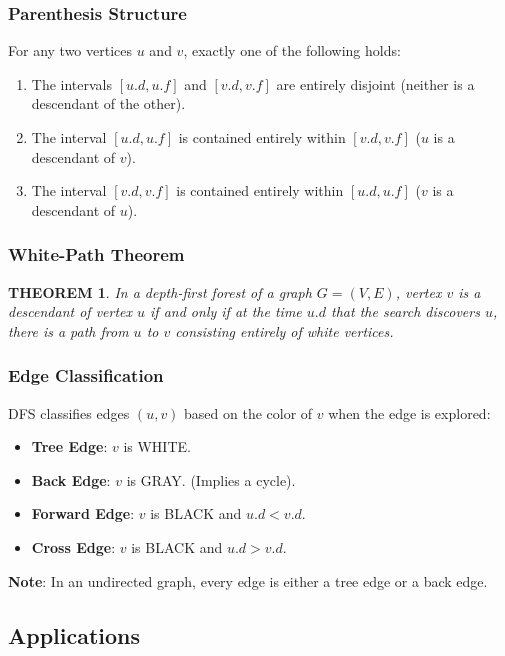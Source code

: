 \documentclass[12pt]{article}
\theoremstyle{blueplain}
\newtheorem{theorem}{THEOREM}[section]
\theoremstyle{bluedef}
\theoremstyle{blueremark}
\begin{document}
\subsubsection{Parenthesis Structure}
For any two vertices $u$ and $v$, exactly one of the following holds:
\begin{enumerate}
    \item The intervals $[u.d, u.f]$ and $[v.d, v.f]$ are entirely disjoint (neither is a descendant of the other).
    \item The interval $[u.d, u.f]$ is contained entirely within $[v.d, v.f]$ ($u$ is a descendant of $v$).
    \item The interval $[v.d, v.f]$ is contained entirely within $[u.d, u.f]$ ($v$ is a descendant of $u$).
\end{enumerate}

\subsubsection{White-Path Theorem}
\begin{theorem}
    In a depth-first forest of a graph $G=(V,E)$, vertex $v$ is a descendant of vertex $u$ if and only if at the time $u.d$ that the search discovers $u$, there is a path from $u$ to $v$ consisting entirely of white vertices.
\end{theorem}

\subsubsection{Edge Classification}
DFS classifies edges $(u, v)$ based on the color of $v$ when the edge is explored:
\begin{itemize}
    \item \textbf{Tree Edge}: $v$ is WHITE.
    \item \textbf{Back Edge}: $v$ is GRAY. (Implies a cycle).
    \item \textbf{Forward Edge}: $v$ is BLACK and $u.d < v.d$.
    \item \textbf{Cross Edge}: $v$ is BLACK and $u.d > v.d$.
\end{itemize}
\textbf{Note}: In an undirected graph, every edge is either a tree edge or a back edge.

\subsection{Applications}
\end{document}
